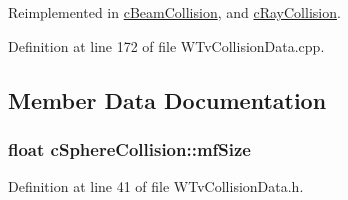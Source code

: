 Reimplemented in \hyperlink{classc_beam_collision_a6c45762164910884d9b28fcc3f991374}{cBeamCollision}, and \hyperlink{classc_ray_collision_a6a1bc84fd74b13f41160423c50b61575}{cRayCollision}.



Definition at line 172 of file WTvCollisionData.cpp.



\subsection{Member Data Documentation}
\hypertarget{classc_sphere_collision_a0ed0a2b1665c13d57b9b263cf32eff21}{
\subsubsection[{mfSize}]{\setlength{\rightskip}{0pt plus 5cm}float {\bf cSphereCollision::mfSize}}}
\label{classc_sphere_collision_a0ed0a2b1665c13d57b9b263cf32eff21}


Definition at line 41 of file WTvCollisionData.h.

